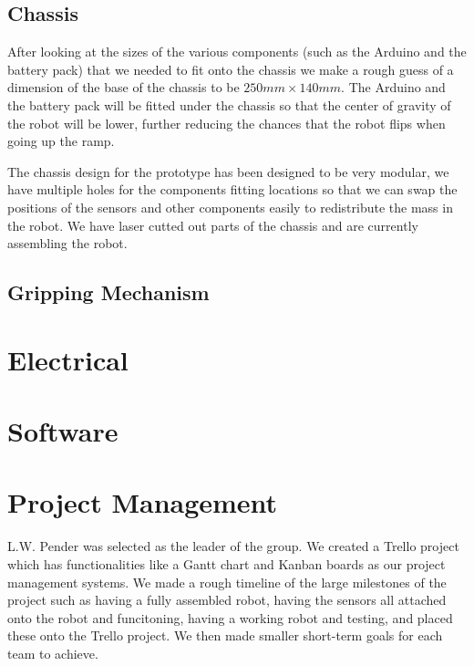 \documentclass{article}
\begin{document}
\subsection{Chassis}
\quad After looking at the sizes of the various components (such as the Arduino and the battery pack) that we needed to fit onto the chassis we make a rough guess of a dimension of the base of the chassis to be $250mm \times 140mm$. The Arduino and the battery pack will be fitted under the chassis so that the center of gravity of the robot will be lower, further reducing the chances that the robot flips when going up the ramp.

The chassis design for the prototype has been designed to be very modular, we have multiple holes for the components fitting locations so that we can swap the positions of the sensors and other components easily to redistribute the mass in the robot. We have laser cutted out parts of the chassis and are currently assembling the robot.

\subsection{Gripping Mechanism}

\section{Electrical}



\section{Software}


\section{Project Management}
\quad L.W. Pender was selected as the leader of the group. We created a Trello project which has functionalities like a Gantt chart and Kanban boards as our project management systems. We made a rough timeline of the large milestones of the project such as having a fully assembled robot, having the sensors all attached onto the robot and funcitoning, having a working robot and testing, and placed these onto the Trello project. We then made smaller short-term goals for each team to achieve.
\end{document}
